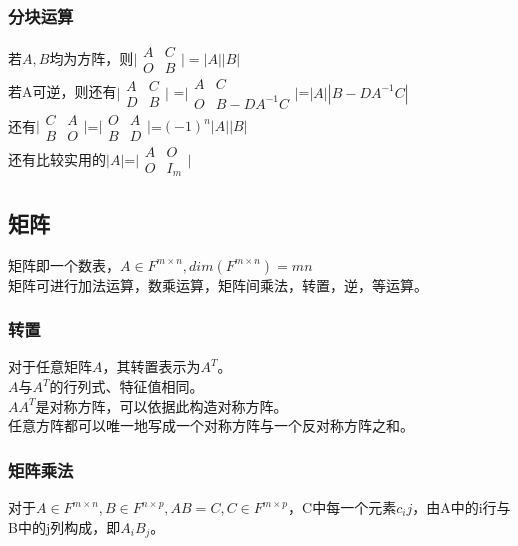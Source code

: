 \documentclass[UTF8]{ctexart}
\begin{document}
\subsubsection{分块运算}
若$A,B$均为方阵，则$\bigl| \begin{smallmatrix} A & C \\ \mathit{O} & B \end{smallmatrix} \bigr|=|A||B|$\\
\indent
若A可逆，则还有$\bigl | \begin{smallmatrix}A&C \\ D&B\end{smallmatrix}\bigr |$ =$\bigl | \begin{smallmatrix}A&C\\\mathit{O}&B-DA^{-1}C \end{smallmatrix}\bigr|$=$|A||B-DA^{-1}C|$\\
\indent
还有$\bigl | \begin{smallmatrix}C&A\\B&\mathit{O}\end{smallmatrix}\bigr |$=$\bigl | \begin{smallmatrix}\mathit{O}&A\\B&D \end{smallmatrix}\bigr |$=$(-1)^{n}|A||B|$\\
\indent
还有比较实用的$|A|$=$\bigl | \begin{smallmatrix}A&\mathit{O}\\\mathit{O}&I_{m}\end{smallmatrix}\bigr |$
\subsection{矩阵}
矩阵即一个数表，$A\in F^{m\times n},dim(F^{m\times n})=mn$\\
\indent
矩阵可进行加法运算，数乘运算，矩阵间乘法，转置，逆，等运算。
\subsubsection{转置}
对于任意矩阵$A$，其转置表示为$A^{T}$。\\
\indent
$A$与$A^{T}$的行列式、特征值相同。\\
\indent
$AA^{T}$是对称方阵，可以依据此构造对称方阵。\\
\indent
任意方阵都可以唯一地写成一个对称方阵与一个反对称方阵之和。
\subsubsection{矩阵乘法}
对于$A\in F^{m\times n},B\in F^{n\times p},AB=C,C\in F^{m\times p}$，C中每一个元素$c_ij$，由A中的i行与B中的j列构成，即$A_iB_j$。
\end{document}
